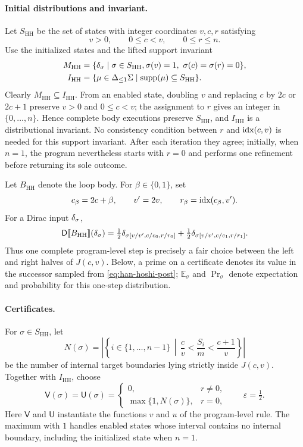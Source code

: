 \paragraph{Initial distributions and invariant.}
Let $S_{\mathrm{HH}}$ be the set of states with integer coordinates
$v,c,r$ satisfying
\begin{equation}
 v>0,\qquad 0\le c<v,\qquad 0\le r\le n.
 \label{eq:han-hoshi-support}
\end{equation}
Use the initialized states and the lifted support invariant
\[
 \begin{aligned}
 M_{\mathrm{HH}}
   &=\{\delta_{\sigma}\mid\sigma\in S_{\mathrm{HH}},
       \sigma(v)=1,\ \sigma(c)=\sigma(r)=0\},\\
 I_{\mathrm{HH}}
   &=\{\mu\in{\Delta_{\leq 1}\Sigma}\mid\textnormal{supp}(\mu)\subseteq S_{\mathrm{HH}}\}.
 \end{aligned}
\]
Clearly $M_{\mathrm{HH}}\subseteq I_{\mathrm{HH}}$. From an enabled
state, doubling $v$ and replacing $c$ by $2c$ or $2c+1$ preserve
$v>0$ and $0\leq c<v$; the assignment to $r$ gives an integer in
$\{0,\ldots,n\}$. Hence complete body executions preserve
$S_{\mathrm{HH}}$, and $I_{\mathrm{HH}}$ is a distributional invariant.
No consistency condition between $r$ and $\textnormal{idx}(c,v)$ is needed for this
support invariant. After each iteration they agree; initially, when
$n=1$, the program nevertheless starts with $r=0$ and performs one
refinement before returning its sole outcome.

Let $B_{\mathrm{HH}}$ denote the loop body. For $\beta\in\{0,1\}$, set
\[
 c_\beta=2c+\beta,\qquad v'=2v,\qquad r_\beta=\textnormal{idx}(c_\beta,v').
\]
For a Dirac input $\delta_{\sigma}$,
\begin{equation}
 \mathsf{D}\llbracket B_{\mathrm{HH}}\rrbracket(\delta_{\sigma})
 =\tfrac12\delta_{\sigma[v/v',c/c_0,r/r_0]}
 +\tfrac12\delta_{\sigma[v/v',c/c_1,r/r_1]}.
 \label{eq:han-hoshi-post}
\end{equation}
Thus one complete program-level step is precisely a fair choice between
the left and right halves of $J(c,v)$. Below, a prime on a certificate
denotes its value in the successor sampled from
\eqref{eq:han-hoshi-post}; $\mathbb E_\sigma$ and $\Pr\nolimits_\sigma$
denote expectation and probability for this one-step distribution.

\paragraph{Certificates.}
For $\sigma\in S_{\mathrm{HH}}$, let
\[
 N(\sigma)
 =\left|\left\{i\in\{1,\ldots,n-1\}\,\middle|\,
 \frac cv<\frac{S_i}{m}<\frac{c+1}{v}\right\}\right|
\]
be the number of internal target boundaries lying strictly inside
$J(c,v)$. Together with $I_{\mathrm{HH}}$, choose
\[
 \mathsf V(\sigma)=\mathsf U(\sigma)=
 \begin{cases}
 0,&r\ne0,\\
 \max\{1,N(\sigma)\},&r=0,
 \end{cases}
 \qquad \varepsilon=\tfrac12.
\]
Here $\mathsf V$ and $\mathsf U$ instantiate the functions $v$ and $u$
of the program-level rule. The maximum with $1$ handles enabled
states whose interval contains no internal boundary, including the
initialized state when $n=1$.

